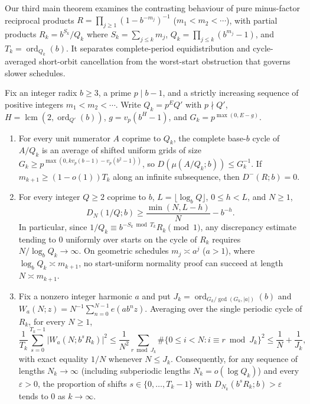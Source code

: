 \documentclass[11pt]{article}
\DeclareMathOperator{\ord}{ord}
\DeclareMathOperator{\lcm}{lcm}
\begin{document}
Our third main theorem examines the contrasting behaviour of pure minus-factor reciprocal products $R=\prod_{j\ge1}(1-b^{-m_j})^{-1}$ ($m_1<m_2<\cdots$), with partial products $R_k=b^{S_k}/Q_k$ where $S_k=\sum_{j\le k}m_j$, $Q_k=\prod_{j\le k}(b^{m_j}-1)$, and $T_k=\ord_{Q_k}(b)$. It separates complete-period equidistribution and cycle-averaged short-orbit cancellation from the worst-start obstruction that governs slower schedules.

\begin{maintheorem}\label{thm:C}
Fix an integer radix $b\ge3$, a prime $p\mid b-1$, and a strictly increasing sequence of positive integers $m_1<m_2<\cdots$. Write $Q_k=p^E Q'$ with $p\nmid Q'$, $H=\lcm(2,\ord_{Q'}(b))$, $g=v_p(b^H-1)$, and $G_k=p^{\max(0,E-g)}$.
\begin{enumerate}[label=\textup{(\roman*)},nosep]
\item For every unit numerator $A$ coprime to $Q_k$, the complete base-$b$ cycle of $A/Q_k$ is an average of shifted uniform grids of size $G_k\ge p^{\max(0,kv_p(b-1)-v_p(b^2-1))}$, so $D(\mu(A/Q_k;b))\le G_k^{-1}$. If $m_{k+1}\ge(1-o(1))T_k$ along an infinite subsequence, then $D^-(R;b)=0$.
\item For every integer $Q\ge2$ coprime to $b$, $L=\lfloor\log_b Q\rfloor$, $0\le h<L$, and $N\ge1$,
\[
D_N(1/Q;b)\ge\frac{\min(N,L-h)}{N}-b^{-h}.
\]
In particular, since $1/Q_k\equiv b^{-S_k\bmod T_k}R_k\pmod1$, any discrepancy estimate tending to $0$ uniformly over starts on the cycle of $R_k$ requires $N/\log_b Q_k\to\infty$. On geometric schedules $m_j\asymp a^j$ ($a>1$), where $\log_b Q_k\asymp m_{k+1}$, no start-uniform normality proof can succeed at length $N\asymp m_{k+1}$.
\item Fix a nonzero integer harmonic $a$ and put $J_k=\ord_{G_k/\gcd(G_k,|a|)}(b)$ and $W_a(N;z)=N^{-1}\sum_{n=0}^{N-1}e(ab^nz)$. Averaging over the single periodic cycle of $R_k$, for every $N\ge1$,
\[
\frac{1}{T_k}\sum_{s=0}^{T_k-1}\bigl|W_a(N;b^sR_k)\bigr|^2
\le\frac{1}{N^2}\sum_{r\bmod J_k}\#\{0\le i<N:i\equiv r\bmod J_k\}^2
\le\frac1N+\frac1{J_k},
\]
with exact equality $1/N$ whenever $N\le J_k$. Consequently, for any sequence of lengths $N_k\to\infty$ (including subperiodic lengths $N_k=o(\log Q_k)$) and every $\varepsilon>0$, the proportion of shifts $s\in\{0,\dots,T_k-1\}$ with $D_{N_k}(b^sR_k;b)>\varepsilon$ tends to $0$ as $k\to\infty$.
\end{enumerate}
\end{maintheorem}
\end{document}
